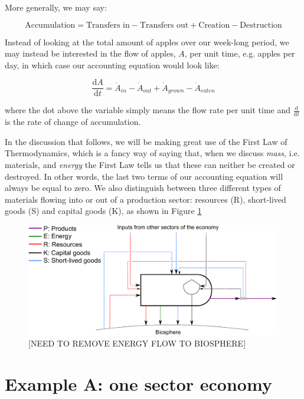 \noindent More generally, we may say:

\begin{equation}
	\textrm{Accumulation}
	= \textrm{Transfers in} 
	- \textrm{Transfers out}
	+ \textrm{Creation}
	- \textrm{Destruction}
\end{equation}

Instead of looking at the total amount of apples over our week-long period, we may instead be interested in the
flow of apples, $A$, per unit time, e.g. apples per day, in which case our accounting equation would look like:

\begin{equation}
	\frac{\mathrm{d}A}{\mathrm{d}t}
	= \dot{A}_{in}
	- \dot{A}_{out}
	+ \dot{A}_{grown}
	- \dot{A}_{eaten}
\end{equation}

\noindent where the dot above the variable simply means the flow rate per unit time and $\frac{\mathrm{d}}{\mathrm{d}t}$
is the rate of change of accumulation.

In the discussion that follows, we will be making great use of the First Law of Thermodynamics, which is a
fancy way of saying that, when we discuss \emph{mass}, i.e. materials, and \emph{energy} the First Law tells
us that these can neither be created or destroyed. In other words, the last two terms of our accounting
equation will always be equal to zero. We also distinguish between three different types of materials flowing
into or out of a production sector: resources (R), short-lived goods (S) and capital goods (K), as shown in Figure
\ref{fig:PERKS_materials}

\begin{figure}[h!]
\centering
\includegraphics[width=0.8\linewidth]{Part_1/Chapter_Materials/images/PERKS_basic_unit_materials.pdf}
\caption{[NEED TO REMOVE ENERGY FLOW TO BIOSPHERE]}
\label{fig:PERKS_materials}
\end{figure}

\section{Example A: one sector economy}
\label{sec:A_materials}


